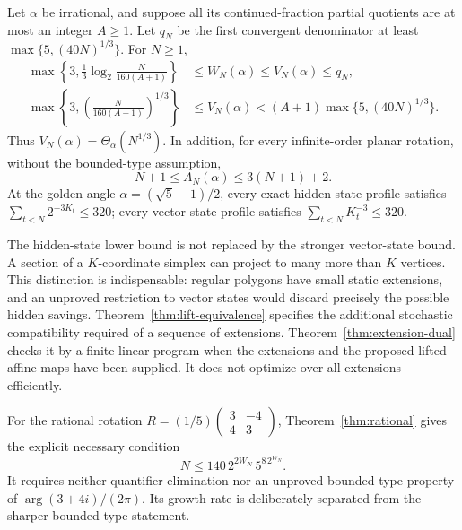 \begin{theorem}\label{thm:main}
Let $\alpha$ be irrational, and suppose all its continued-fraction partial
quotients are at most an integer $A\ge1$. Let $q_N$ be the first convergent
denominator at least $\max\{5,(40N)^{1/3}\}$. For $N\ge1$,
\begin{align}
 \max\!\left\{3,\frac13\log_2\frac{N}{160(A+1)}\right\}
 &\le W_N(\alpha)\le V_N(\alpha)\le q_N,
                                                        \label{eq:main-hidden}\\
 \max\!\left\{3,\left(\frac{N}{160(A+1)}\right)^{1/3}\right\}
 &\le V_N(\alpha)<(A+1)\max\{5,(40N)^{1/3}\}.             \label{eq:main-vector}
\end{align}
Thus $V_N(\alpha)=\Theta_\alpha(N^{1/3})$. In addition, for every
infinite-order planar rotation, without the bounded-type assumption,
\begin{equation}\label{eq:main-autonomous}
             N+1\le A_N(\alpha)\le3(N+1)+2.
\end{equation}
At the golden angle $\alpha=(\sqrt5-1)/2$, every exact hidden-state
profile satisfies $\sum_{t<N}2^{-3K_t}\le320$; every vector-state
profile satisfies $\sum_{t<N}K_t^{-3}\le320$.
\end{theorem}

The hidden-state lower bound is not replaced by the stronger vector-state
bound. A section of a $K$-coordinate simplex can project to many more than
$K$ vertices. This distinction is indispensable: regular polygons have
small static extensions, and an unproved restriction to vector states
would discard precisely the possible hidden savings.
Theorem~\ref{thm:lift-equivalence} specifies the additional stochastic
compatibility required of a sequence of extensions. Theorem~\ref{thm:extension-dual}
checks it by a finite linear program when the extensions and the proposed
lifted affine maps have been supplied. It does not optimize over all
extensions efficiently.

For the rational rotation $R=(1/5)\left(\begin{smallmatrix}3&-4\\4&3\end{smallmatrix}\right)$,
Theorem~\ref{thm:rational} gives the explicit necessary condition
\[
             N\le140\,2^{2W_N}\,5^{8\,2^{W_N}}.
\]
It requires neither quantifier elimination nor an unproved bounded-type
property of $\arg(3+4i)/(2\pi)$. Its growth rate is deliberately
separated from the sharper bounded-type statement.

